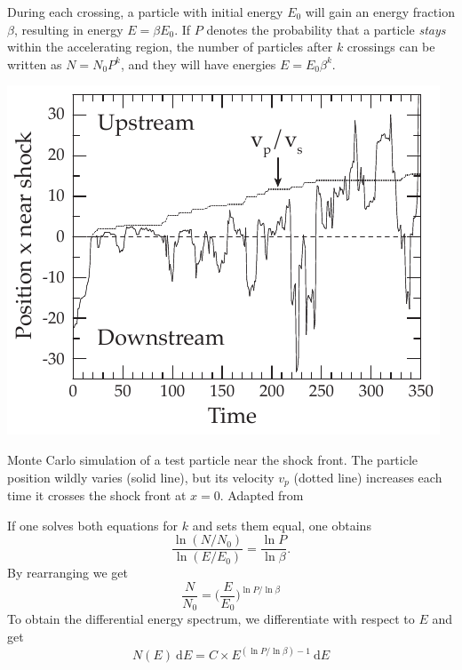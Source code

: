 \documentclass[
    a4paper, %
    fontsize=10pt, %
    twoside=false, %
    numbers=noenddot, %
    fontmethod=tex,
]{kaobook}
\begin{document}
During each crossing, a particle with initial energy $E_0$ will gain an energy fraction $\beta$, resulting in energy $E=\beta E_0$. If $P$ denotes the probability that a particle \textit{stays} within the accelerating region, the number of particles after $k$ crossings can be written as $N=N_0 P^k $, and they will have energies $E=E_0\beta^k$.

\begin{marginfigure}
    \includegraphics{theory/dsa_mc.pdf}
    \caption[DSA Monte Carlo]{Monte Carlo simulation of a test particle near the shock front. The particle position wildly varies (solid line), but its velocity $v_p$ (dotted line) increases each time it crosses the shock front at $x=0$. Adapted from \cite{Baring1997}}
\end{marginfigure}

If one solves both equations for $k$ and sets them equal, one obtains
\begin{equation}
    \frac{\ln (N/N_0)}{\ln (E/E_0)} = \frac{\ln P}{\ln \beta}.
\end{equation}
By rearranging we get
\begin{equation}
    \frac{N}{N_0} = \bigg(\frac{E}{E_0}\bigg)^{\ln P / \ln \beta}
\end{equation}
To obtain the differential energy spectrum, we differentiate with respect to $E$ and get
\begin{equation}
\label{eqn:diff_e_spec}
    N(E)~\text{d} E = C\times E^{(\ln P/\ln\beta)-1}~\text{d} E
\end{equation}
\end{document}
